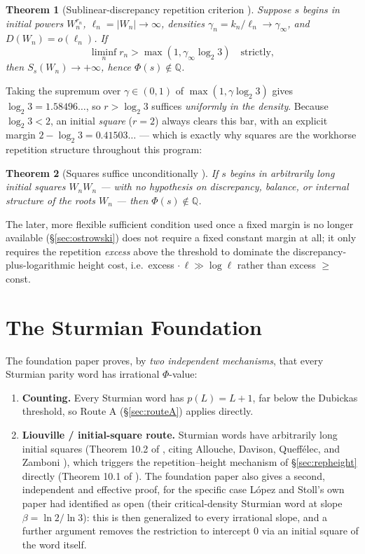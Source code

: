 \documentclass[11pt]{article}
\newtheorem{theorem}{Theorem}[section]
\newcommand{\Q}{\mathbb{Q}}
\begin{document}
\begin{theorem}[Sublinear-discrepancy repetition criterion \cite{Phase1Discrepancy}]
Suppose $s$ begins in initial powers $W_n^{r_n}$, $\ell_n=|W_n|\to\infty$, densities $\gamma_n=k_n/\ell_n\to\gamma_\infty$, and $D(W_n)=o(\ell_n)$. If
\[
\liminf_n r_n > \max(1,\gamma_\infty\log_2 3) \quad\text{strictly},
\]
then $S_s(W_n)\to+\infty$, hence $\Phi(s)\notin\Q$.
\end{theorem}
Taking the supremum over $\gamma\in(0,1)$ of $\max(1,\gamma\log_2 3)$ gives $\log_2 3=1.58496\ldots$, so $r>\log_2 3$ suffices \emph{uniformly in the density}. Because $\log_2 3<2$, an initial \emph{square} ($r=2$) always clears this bar, with an explicit margin $2-\log_2 3=0.41503\ldots$ --- which is exactly why squares are the workhorse repetition structure throughout this program:

\begin{theorem}[Squares suffice unconditionally \cite{Phase1Repetition}]
If $s$ begins in arbitrarily long initial squares $W_nW_n$ --- with \emph{no} hypothesis on discrepancy, balance, or internal structure of the roots $W_n$ --- then $\Phi(s)\notin\Q$.
\end{theorem}

The later, more flexible sufficient condition used once a fixed margin is no longer available (\S\ref{sec:ostrowski}) does not require a fixed constant margin at all; it only requires the repetition \emph{excess} above the threshold to dominate the discrepancy-plus-logarithmic height cost, i.e.\ excess $\cdot\, \ell \gg \log \ell$ rather than excess $\ge$ const.

\section{The Sturmian Foundation}
\label{sec:sturmian}

The foundation paper \cite{DeJesus2026Sturmian} proves, by \emph{two independent mechanisms}, that every Sturmian parity word has irrational $\Phi$-value:

\begin{enumerate}
\item \textbf{Counting.} Every Sturmian word has $p(L)=L+1$, far below the Dubickas threshold, so Route A (\S\ref{sec:routeA}) applies directly.
\item \textbf{Liouville / initial-square route.} Sturmian words have arbitrarily long initial squares (Theorem 10.2 of \cite{DeJesus2026Sturmian}, citing Allouche, Davison, Queffélec, and Zamboni \cite{ADQZ2001}), which triggers the repetition--height mechanism of \S\ref{sec:repheight} directly (Theorem 10.1 of \cite{DeJesus2026Sturmian}). The foundation paper also gives a second, independent and effective proof, for the specific case López and Stoll's own paper \cite{LopezStoll2009} had identified as open (their critical-density Sturmian word at slope $\beta=\ln2/\ln3$): this is then generalized to every irrational slope, and a further argument removes the restriction to intercept $0$ via an initial square of the word itself.
\end{enumerate}
\end{document}
